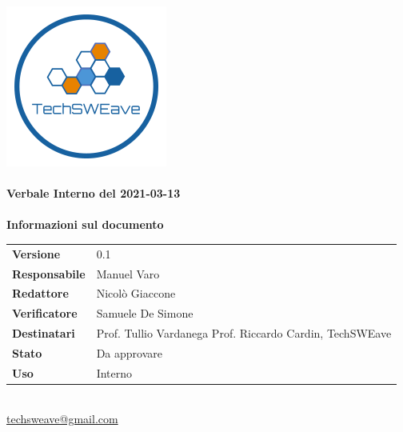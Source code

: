 \documentclass[a4paper]{article}
\begin{document}
        
    \begin{titlepage}
        \begin{center}
            \includegraphics{../../../../Images/logo.png}\\
            \vspace{20px}
            \textcolor{logo}{\hrulefill}\\
            \vspace{20px}
            \textbf{\huge\textcolor{logo}{Verbale Interno del 2021-03-13}}\\
            \vspace{10px}
            \textcolor{logo}{\hrulefill}\\
            \vspace{40px}
            \textbf{\Large Informazioni sul documento}\\
            \vspace{20px}
            \begin{tabular}{p{100px} | p{100px}}
                \textbf{Versione} & 0.1\\
                \textbf{Responsabile} & Manuel Varo\\
                \textbf{Redattore} & Nicolò Giaccone\\
                \textbf{Verificatore} & Samuele De Simone\\
                \textbf{Destinatari} & Prof. Tullio Vardanega \newline Prof. Riccardo Cardin, \newline TechSWEave\\
                \textbf{Stato} & Da approvare\\
                \textbf{Uso} & Interno\\
            \end{tabular}\\
            \vspace{60px}
            \href{mailto:techsweave@gmail.com}{techsweave@gmail.com}\\
    
        \end{center}
        \end{titlepage}
    
\end{document}
